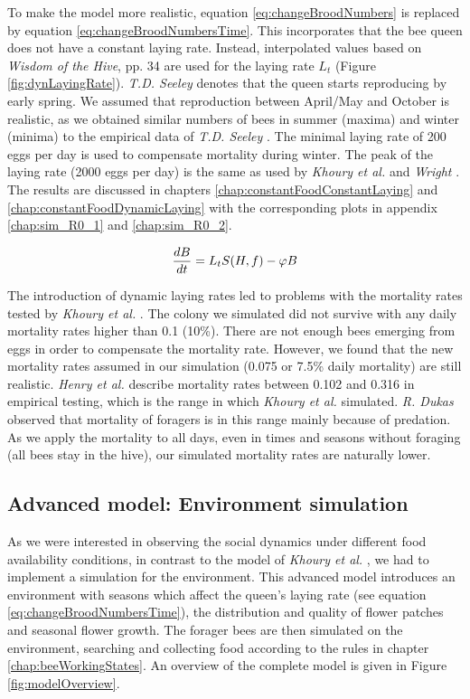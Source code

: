 		To make the model more realistic, equation \ref{eq:changeBroodNumbers} is replaced by equation \ref{eq:changeBroodNumbersTime}. This incorporates that the bee queen does not have a constant laying rate. Instead, interpolated values based on \textit{Wisdom of the Hive}, pp. 34 \cite{seeley95} are used for the laying rate $L_t$ (Figure \ref{fig:dynLayingRate}). \textit{T.D. Seeley} denotes that the queen starts reproducing by early spring. We assumed that reproduction between April/May and October is realistic, as we obtained similar numbers of bees in summer (maxima) and winter (minima) to the empirical data of \textit{T.D. Seeley} \cite{seeley95}. The minimal laying rate of 200 eggs per day is used to compensate mortality during winter. The peak of the laying rate (2000 eggs per day) is the same as used by \textit{Khoury et al.} \cite{khoury13} and \textit{Wright} \cite{wright08}. The results are discussed in chapters \ref{chap:constantFoodConstantLaying} and \ref{chap:constantFoodDynamicLaying} with the corresponding plots in appendix \ref{chap:sim_R0_1} and \ref{chap:sim_R0_2}.
		
		\begin{equation}\label{eq:changeBroodNumbersTime}
			{dB \over dt} = L_tS(H,f)-\phi B
		\end{equation}
		
		The introduction of dynamic laying rates led to problems with the mortality rates tested by \textit{Khoury et al.} \cite{khoury13}. The colony we simulated did not survive with any daily mortality rates higher than 0.1 (10\%). There are not enough bees emerging from eggs in order to compensate the mortality rate. However, we found that the new mortality rates assumed in our simulation (0.075 or 7.5\% daily mortality) are still realistic. \textit{Henry et al.} \cite{henry12} describe mortality rates between 0.102 and 0.316 in empirical testing, which is the range in which \textit{Khoury et al.} \cite{khoury13} simulated. \textit{R. Dukas} \cite{dukas08} observed that mortality of foragers is in this range mainly because of predation. As we apply the mortality to all days, even in times and seasons without foraging (all bees stay in the hive), our simulated mortality rates are naturally lower.
	
	\subsection{Advanced model: Environment simulation}
		\label{chap:advancedModel}
		
		As we were interested in observing the social dynamics under different food availability conditions, in contrast to the model of \textit{Khoury et al.} \cite{khoury13}, we had to implement a simulation for the environment. This advanced model introduces an environment with seasons which affect the queen's laying rate (see equation \ref{eq:changeBroodNumbersTime}), the distribution and quality of flower patches and seasonal flower growth.
		The forager bees are then simulated on the environment, searching and collecting food according to the rules in chapter \ref{chap:beeWorkingStates}. An overview of the complete model is given in Figure \ref{fig:modelOverview}.
		
